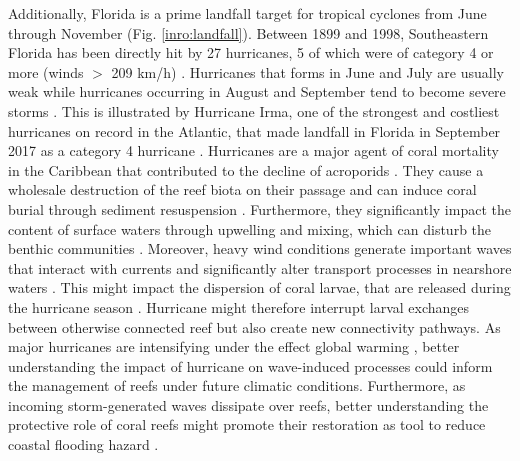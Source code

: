 Additionally, Florida is a prime landfall target for tropical cyclones from June through November (Fig. \ref{inro:landfall}). Between 1899 and 1998, Southeastern Florida has been directly hit by 27 hurricanes, 5 of which were of category 4 or more (winds $>$ 209 km/h) \citep{neumann1999tropical}. Hurricanes that forms in June and July are usually weak while hurricanes occurring in August and September tend to become severe storms \citep{banks2008reef}. This is illustrated by Hurricane Irma, one of the strongest and costliest hurricanes on record in the Atlantic, that made landfall in Florida in September 2017 as a category 4 hurricane \citep{irmaNOAA, xian2018brief}. Hurricanes are a major agent of coral mortality in the Caribbean that contributed to the decline of acroporids \citep{gardner2003long,aronson2001white}. They cause a wholesale destruction of the reef biota on their passage and can induce coral burial through sediment resuspension \citep{banks2008reef, miller2008effects}. Furthermore, they significantly impact the content of surface waters through upwelling and mixing, which can disturb the benthic communities \citep{wachnicka2019hurricane,varlas2020investigating}. Moreover, heavy wind conditions generate important waves that interact with currents and significantly alter transport processes in nearshore waters \citep{niu2017role,mao2020particle}. This might impact the dispersion of coral larvae, that are released during the hurricane season \citep{frys2020fine}. Hurricane might therefore interrupt larval exchanges between otherwise connected reef but also create new connectivity pathways. As major hurricanes are intensifying under the effect global warming \citep{bhatia2019recent,knutson2020tropical}, better understanding the impact of hurricane on wave-induced processes could inform the management of reefs under future climatic conditions. Furthermore, as incoming storm-generated waves dissipate over reefs, better understanding the protective role of coral reefs might promote their restoration as tool to reduce coastal flooding hazard \citep{roelvink2021coral}.

